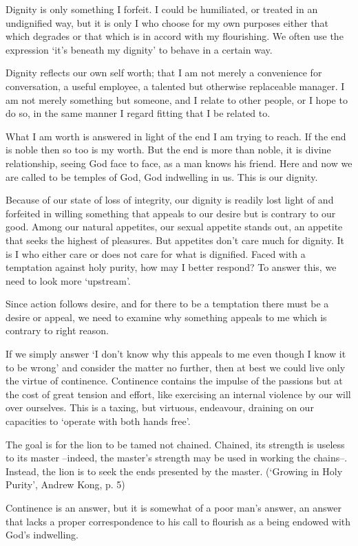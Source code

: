 \documentclass[12pt]{article}
\begin{document}
Dignity is only something I forfeit. I could be humiliated, or treated in an undignified way, but it is only I who choose for my own purposes either that which degrades or that which is in accord with my flourishing. We often use the expression `it’s beneath my dignity' to behave in a certain way.

Dignity reflects our own self worth; that I am not merely a convenience for conversation, a useful employee, a talented but otherwise replaceable manager. I am not merely something but someone, and I relate to other people, or I hope to do so, in the same manner I regard fitting that I be related to.

What I am worth is answered in light of the end I am trying to reach. If the end is noble then so too is my worth. But the end is more than noble, it is divine relationship, seeing God face to face, as a man knows his friend. Here and now we are called to be temples of God, God indwelling in us. This is our dignity.

Because of our state of loss of integrity, our dignity is readily lost light of and forfeited in willing something that appeals to our desire but is contrary to our good. Among our natural appetites, our sexual appetite stands out, an appetite that seeks the highest of pleasures. But appetites don’t care much for dignity. It is I who either care or does not care for what is dignified. Faced with a temptation against holy purity, how may I better respond? To answer this, we need to look more ‘upstream’.

Since action follows desire, and for there to be a temptation there must be a desire or appeal, we need to examine why something appeals to me which is contrary to right reason.

If we simply answer `I don’t know why this appeals to me even though I know it to be wrong' and consider the matter no further, then at best we could live only the virtue of continence. Continence contains the impulse of the passions but at the cost of great tension and effort, like exercising an internal violence by our will over ourselves. This is a taxing, but virtuous, endeavour, draining on our capacities to `operate with both hands free'.
\begin{displayquote}
The goal is for the lion to be tamed not chained. Chained, its strength is useless to its master --indeed, the master’s strength may be used in working the chains--. Instead, the lion is to seek the ends presented by the master.
(`Growing in Holy Purity', Andrew Kong, p. 5)
\end{displayquote}
Continence is an answer, but it is somewhat of a poor man's answer, an answer that lacks a proper correspondence to his call to flourish as a being endowed with God’s indwelling.
\end{document}
